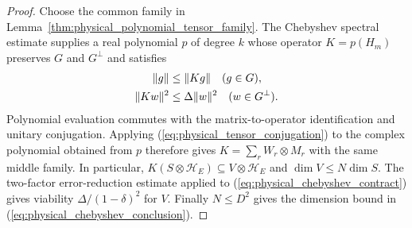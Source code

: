 \begin{proof}\leanok
    Choose the common family in
    Lemma~\ref{thm:physical_polynomial_tensor_family}.
    The Chebyshev spectral estimate supplies a real polynomial $p$ of degree
    $k$ whose operator $K=p(H_m)$ preserves $G$ and $G^\perp$ and satisfies
    \begin{align}
        \|g\|    & \le\|Kg\|\quad(g\in G),\notag        \\
        \|Kw\|^2 & \le\Delta\|w\|^2\quad(w\in G^\perp).
        \label{eq:physical_chebyshev_contract}
    \end{align}
    Polynomial evaluation commutes with the matrix-to-operator identification
    and unitary conjugation. Applying
    (\ref{eq:physical_tensor_conjugation}) to the complex polynomial obtained
    from $p$ therefore gives $K=\sum_r W_r\otimes M_r$ with the same middle
    family. In particular, $K(S\otimes\mathcal H_E)\subseteq
        V\otimes\mathcal H_E$ and $\dim V\le N\dim S$.
    The two-factor error-reduction estimate applied to
    (\ref{eq:physical_chebyshev_contract}) gives viability
    $\Delta/(1-\delta)^2$ for $V$. Finally $N\le D^2$ gives the dimension
    bound in (\ref{eq:physical_chebyshev_conclusion}).
\end{proof}
